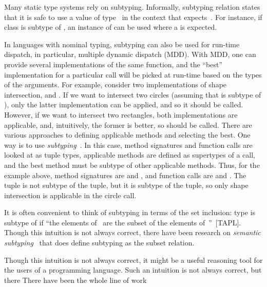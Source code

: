 Many static type systems rely on subtyping.
Informally, subtyping relation  states that it is safe
to use a value of type~ in the context that expects~.
For instance, if class  is subtype of ,
an instance of  can be used where a 
is expected.

In languages with nominal typing, subtyping can also be used for run-time
dispatch, in particular, multiple dynamic dispatch (MDD).
With MDD, one can provide several implementations of the same function,
and the ``best'' implementation for a particular call will be picked 
at run-time based on the types of the arguments.
For example, consider two implementations of shape intersection,
 and .
If we want to intersect two circles (assuming that 
is subtype of ), only the latter implementation can be applied,
and so it should be called.
However, if we want to intersect two rectangles, both implementations 
are applicable, and, intuitively, the former is better, 
so  should be called.
There are various approaches to defining applicable methods and selecting
the best. One way is to use \emph{subtyping}~\cite{?}.
In this case, method signatures and function calls are looked at 
as tuple types, applicable methods are defined as supertypes of a call, 
and the best method must be subtype of other applicable methods. 
Thus, for the example above, method signatures are 
 and ,
and function calls are
 and .
The  tuple is not subtype of the  tuple, 
but it is subtype of the  tuple, so only shape intersection
is applicable in the circle call.



It is often convenient to think of subtyping in terms of the set inclusion:
type  is subtype of  if ``the elements of~
are the subset of the elements of~''~[TAPL].
Though this intuition is not always correct, there have been research on
\emph{semantic subtyping}~\cite{??} that does define subtyping as the subset
relation.

Though this intuition is not always correct, it might be a useful reasoning tool
for the users of a programming language.
Such an intuition is not always correct, but there
There have been the whole line of work 




